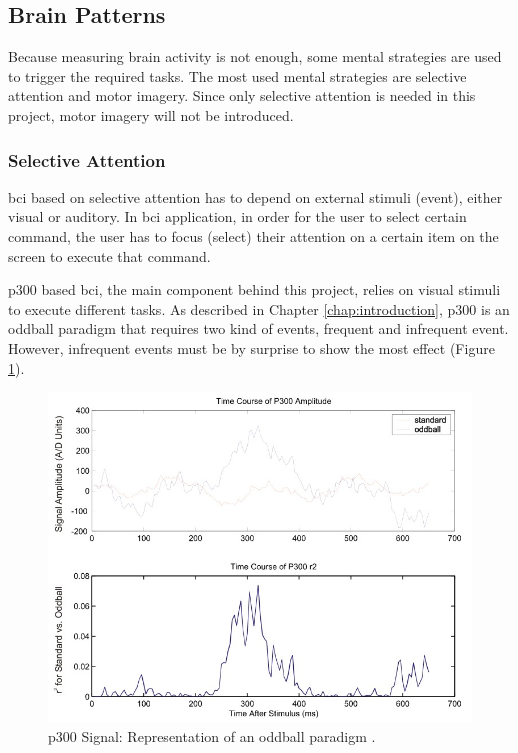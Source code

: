 \subsection{Brain Patterns}
Because measuring brain activity is not enough, some mental strategies are used to trigger the required tasks. The most used mental strategies are selective attention and motor imagery. Since only selective attention is needed in this project, motor imagery will not be introduced.\par
\subsubsection{Selective Attention}
\ac{bci} based on selective attention has to depend on external stimuli (event), either visual or auditory. In \ac{bci} application, in order for the user to select certain command, the user has to focus (select) their attention on a certain item on the screen to execute that command.\par
\ac{p300} based \ac{bci}, the main component behind this project, relies on visual stimuli to execute different tasks. As described in Chapter \ref{chap:introduction}, \ac{p300} is an oddball paradigm that requires two kind of events, frequent and infrequent event. However, infrequent events must be by surprise to show the most effect (Figure \ref{fig:p300-signal}).\par
\begin{figure}[!ht]
    \centering
    \includegraphics[width=\figureWidth]{images/background/p300_signal.jpg}
    \caption{\ac{p300} Signal: Representation of an oddball paradigm \cite{article1}.}
    \label{fig:p300-signal}
\end{figure}
